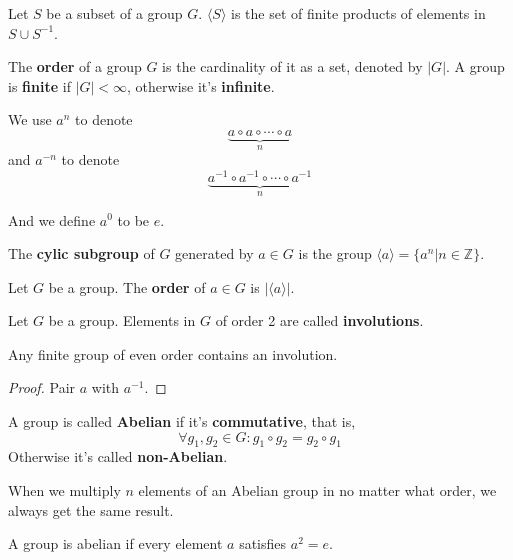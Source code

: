 \documentclass[12pt]{book}
\begin{document}
\begin{lemma}
	Let $S$ be a subset of a group $G$. $\langle S\rangle$ is the set of finite products of elements in $S\cup S^{-1}$.
\end{lemma}
	
\begin{definition}
	The \textbf{order} of a group $G$ is the cardinality of it as a set, denoted by $|G|$. A group is \textbf{finite} if $|G|<\infty$, otherwise it's \textbf{infinite}.
\end{definition}
		
	We use $a^n$ to denote
	\begin{equation}
		\underbrace{a\circ a \circ\cdots\circ a}_n
	\end{equation}
	and $a^{-n}$ to denote 
	\begin{equation}
		\underbrace{a^{-1}\circ a^{-1} \circ\cdots\circ a^{-1}}_n
	\end{equation}
	
	And we define $a^0$ to be $e$.
	
\begin{definition}
	The {\bf cylic subgroup} of $G$ generated by $a\in G$ is the group $\langle a\rangle=\{a^n|n\in\mathbb Z\}$.
\end{definition}
\begin{definition}
	Let $G$ be a group. The {\bf order} of $a\in G$ is $|\langle a\rangle|$.
\end{definition}
\begin{definition}
	Let $G$ be a group. Elements in $G$ of order 2 are called {\bf involutions}.
\end{definition}
	\begin{lemma}
		Any finite group of even order contains an involution.
	\end{lemma}
	\begin{proof}
		Pair $a$ with $a^{-1}$.
	\end{proof}
	
\begin{definition}
	A group is called \textbf{Abelian} if it's \textbf{commutative}, that is,
	\begin{equation}
		\forall g_1,g_2\in G: g_1\circ g_2=g_2\circ g_1
	\end{equation}
	Otherwise it's called \textbf{non-Abelian}.
\end{definition}
	\begin{lemma}
		When we multiply $n$ elements of an Abelian group in no matter what order, we always get the same result.
	\end{lemma}
	\begin{lemma}
		A group is abelian if every element $a$ satisfies $a^2=e$.
	\end{lemma}
\end{document}
